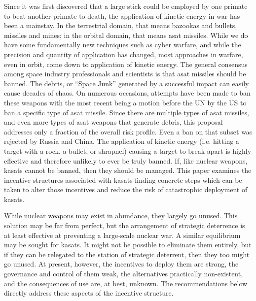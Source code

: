 
\maketitle

\pagestyle{execSummary}
\thispagestyle{firstPage}



Since it was first discovered that a large stick could be employed by
one primate to beat another primate to death, the application of
kinetic energy in war has been a mainstay.  In the terrestrial domain,
that means bazookas and bullets, missiles and mines; in the orbital
domain, that means \ac{asat} missiles.  While we do have some
fundamentally new techniques such as cyber warfare\cite{big-risks},
and while the precision and quantity of application has changed, most
approaches in warfare, even in orbit, come down to application of
kinetic energy.\cite{brian} The general consensus among space industry
professionals and scientists is that \ac{asat} missiles should be
banned.  The debris, or ``Space Junk'' generated by a successful
impact can easily cause decades of chaos.  On numerous occasions,
attempts have been made to ban these weapons with the most recent
being a motion before the UN by the US to ban a specific type of
\ac{asat} missile.  Since there are multiple types of \ac{asat}
missiles, and even more types of \ac{asat} weapons that generate
debris, this proposal addresses only a fraction of the overall risk
profile.  Even a ban on that subset was rejected by Russia and China.
The application of kinetic energy (i.e. hitting a target with a rock,
a bullet, or shrapnel) causing a target to break apart is highly
effective and therefore unlikely to ever be truly banned.  If, like
nuclear weapons, \acp{kasat} cannot be banned, then they should be
managed.  This paper examines the incentive structures associated with
\acp{kasat} finding concrete steps which can be taken to alter those
incentives and reduce the risk of catastrophic deployment of
\acp{kasat}.

While nuclear weapons may exist in abundance, they largely go unused.
This solution may be far from perfect, but the arrangement of
strategic deterrence is at least effective at preventing a large-scale
nuclear war.  A similar equilibrium may be sought for \acp{kasat}.  It
might not be possible to eliminate them entirely, but if they can be
relegated to the station of strategic deterrent, then they too might
go unused.  At present, however, the incentives to deploy them are
strong, the governance and control of them weak, the alternatives
practically non-existent, and the consequences of use are, at best,
unknown.  The recommendations below directly address these aspects of
the incentive structure.

